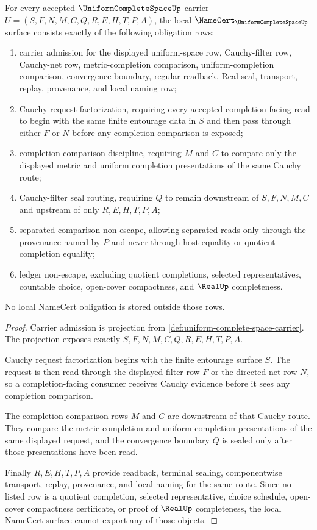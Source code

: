 \begin{theorem}
\label{thm:uniform-complete-space-namecert-obligations}
For every accepted $\UniformCompleteSpaceUp$ carrier
$U=(S,F,N,M,C,Q,R,E,H,T,P,A)$, the local
$\NameCert_{\UniformCompleteSpaceUp}$ surface consists exactly of the following
obligation rows:
\begin{enumerate}
\item carrier admission for the displayed uniform-space row, Cauchy-filter
row, Cauchy-net row, metric-completion comparison, uniform-completion
comparison, convergence boundary, regular readback, Real seal, transport,
replay, provenance, and local naming row;
\item Cauchy request factorization, requiring every accepted completion-facing
read to begin with the same finite entourage data in $S$ and then pass through
either $F$ or $N$ before any completion comparison is exposed;
\item completion comparison discipline, requiring $M$ and $C$ to compare only
the displayed metric and uniform completion presentations of the same Cauchy
route;
\item Cauchy-filter seal routing, requiring $Q$ to remain downstream of
$S,F,N,M,C$ and upstream of only $R,E,H,T,P,A$;
\item separated comparison non-escape, allowing separated reads only through
the provenance named by $P$ and never through host equality or quotient
completion equality;
\item ledger non-escape, excluding quotient completions, selected
representatives, countable choice, open-cover compactness, and $\RealUp$
completeness.
\end{enumerate}
No local NameCert obligation is stored outside those rows.
\end{theorem}
\begin{proof}
Carrier admission is projection from
\autoref{def:uniform-complete-space-carrier}. The projection exposes exactly
$S,F,N,M,C,Q,R,E,H,T,P,A$.

Cauchy request factorization begins with the finite entourage surface $S$.
The request is then read through the displayed filter row $F$ or the directed
net row $N$, so a completion-facing consumer receives Cauchy evidence before
it sees any completion comparison.

The completion comparison rows $M$ and $C$ are downstream of that Cauchy route.
They compare the metric-completion and uniform-completion presentations of the
same displayed request, and the convergence boundary $Q$ is sealed only after
those presentations have been read.

Finally $R,E,H,T,P,A$ provide readback, terminal sealing, componentwise
transport, replay, provenance, and local naming for the same route. Since no
listed row is a quotient completion, selected representative, choice schedule,
open-cover compactness certificate, or proof of $\RealUp$ completeness, the
local NameCert surface cannot export any of those objects.
\end{proof}

